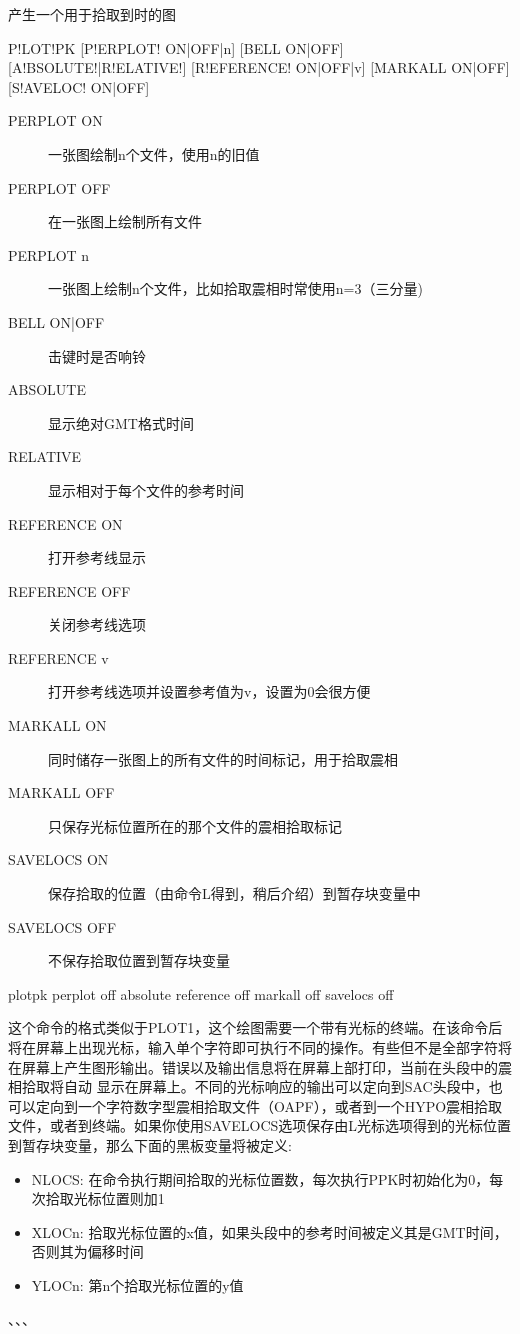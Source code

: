 \label{cmd:plotpk}

产生一个用于拾取到时的图

\begin{SACSTX}
P!LOT!PK [P!ERPLOT! ON|OFF|n] [BELL ON|OFF] [A!BSOLUTE!|R!ELATIVE!]
    [R!EFERENCE! ON|OFF|v] [MARKALL ON|OFF] [S!AVELOC! ON|OFF]
\end{SACSTX}

\begin{description}
\item [PERPLOT ON] 一张图绘制n个文件，使用n的旧值
\item [PERPLOT OFF] 在一张图上绘制所有文件
\item [PERPLOT n] 一张图上绘制n个文件，比如拾取震相时常使用n=3（三分量)
\item [BELL ON|OFF]  击键时是否响铃
\item [ABSOLUTE] 显示绝对GMT格式时间
\item [RELATIVE] 显示相对于每个文件的参考时间
\item [REFERENCE ON] 打开参考线显示
\item [REFERENCE OFF] 关闭参考线选项
\item [REFERENCE v] 打开参考线选项并设置参考值为v，设置为0会很方便
\item [MARKALL ON] 同时储存一张图上的所有文件的时间标记，用于拾取震相
\item [MARKALL OFF] 只保存光标位置所在的那个文件的震相拾取标记
\item [SAVELOCS ON]  保存拾取的位置（由命令L得到，稍后介绍）到暂存块变量中
\item [SAVELOCS OFF]  不保存拾取位置到暂存块变量
\end{description}

\begin{SACDFT}
plotpk perplot off absolute reference off markall off savelocs off
\end{SACDFT}

这个命令的格式类似于PLOT1，这个绘图需要一个带有光标的终端。在该命令后将在屏幕上出现光标，输入单个字符即可执行不同的操作。有些但不是全部字符将在屏幕上产生图形输出。错误以及输出信息将在屏幕上部打印，当前在头段中的震相拾取将自动	显示在屏幕上。不同的光标响应的输出可以定向到SAC头段中，也可以定向到一个字符数字型震相拾取文件（OAPF），或者到一个HYPO震相拾取文件，或者到终端。如果你使用SAVELOCS选项保存由L光标选项得到的光标位置到暂存块变量，那么下面的黑板变量将被定义:
\begin{itemize}
\item NLOCS: 在命令执行期间拾取的光标位置数，每次执行PPK时初始化为0，每次拾取光标位置则加1
\item XLOCn: 拾取光标位置的x值，如果头段中的参考时间被定义其是GMT时间，否则其为偏移时间
\item YLOCn: 第n个拾取光标位置的y值
\end{itemize}

、、、
